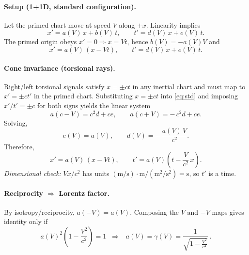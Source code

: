 \documentclass[10pt,reprint,aps,onecolumn,nofootinbib]{revtex4-2}
\begin{document}
        \paragraph{Setup (1+1D, standard configuration).}
            Let the primed chart move at speed $V$ along $+x$. Linearity implies
            \begin{equation}
                x' = a(V)\,x + b(V)\,t,\qquad t' = d(V)\,x + e(V)\,t. \label{eq:lin}
            \end{equation}
            The primed origin obeys $x'=0 \Rightarrow x=Vt$, hence $b(V)=-a(V)V$ and
            \begin{equation}
                x' = a(V)\,(x - Vt), \qquad t' = d(V)\,x + e(V)\,t. \label{eq:std}
            \end{equation}

        \paragraph{Cone invariance (torsional rays).}
            Right/left torsional signals satisfy $x=\pm ct$ in any inertial chart and must map to $x'=\pm c t'$ in the primed chart. Substituting $x=\pm ct$ into \eqref{eq:std} and imposing $x'/t'=\pm c$ for both signs yields the linear system
            \begin{equation}
                a(c - V) = c^{2} d + c e,\qquad a(c + V) = -\,c^{2} d + c e.
            \end{equation}
            Solving,
            \begin{equation}
                e(V)=a(V), \qquad d(V)=-\,\frac{a(V)\,V}{c^{2}}. \label{eq:de}
            \end{equation}
            Therefore,
            \begin{equation}
                \boxed{~x' = a(V)\,(x - Vt), \qquad t' = a(V)\!\left(t - \frac{V}{c^{2}}\,x\right).~} \label{eq:preLorentz}
            \end{equation}
            \emph{Dimensional check:} $Vx/c^2$ has units $(\mathrm{m/s})\cdot \mathrm{m}/(\mathrm{m^2/s^2})=\mathrm{s}$, so $t'$ is a time.

        \paragraph{Reciprocity $\Rightarrow$ Lorentz factor.}
            By isotropy/reciprocity, $a(-V)=a(V)$. Composing the $V$ and $-V$ maps gives identity only if
            \begin{equation}
                a(V)^2\!\left(1 - \frac{V^2}{c^2}\right)=1
                \;\;\Rightarrow\;\;
                \boxed{~a(V)=\gamma(V)=\frac{1}{\sqrt{1-\tfrac{V^2}{c^2}}}~}. \label{eq:gamma}
            \end{equation}
\end{document}
